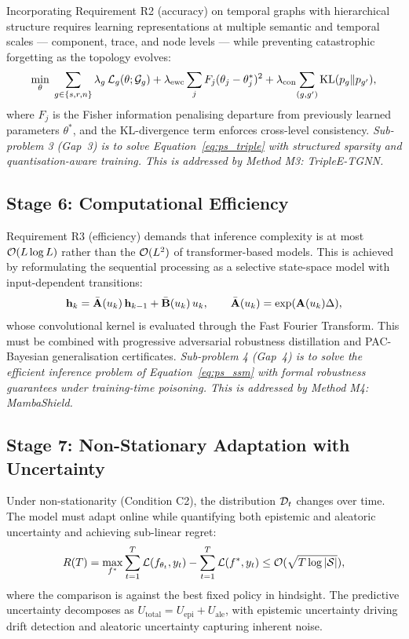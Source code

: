 Incorporating Requirement R2 (accuracy) on temporal graphs with hierarchical structure requires learning representations at multiple semantic and temporal scales --- component, trace, and node levels --- while preventing catastrophic forgetting as the topology evolves:
\begin{equation}
\min_\theta\;
\sum_{g\in\{s,r,n\}}\lambda_g\,\mathcal{L}_g(\theta;\mathcal{G}_g)
+ \lambda_{\mathrm{ewc}}\sum_j F_j(\theta_j-\theta_{j}^{*})^2
+ \lambda_{\mathrm{con}}\!\sum_{(g,g')}\mathrm{KL}(p_g\|p_{g'}),
\label{eq:ps_triple}
\end{equation}
where $F_j$ is the Fisher information penalising departure from previously learned parameters $\theta^*$, and the KL-divergence term enforces cross-level consistency. \emph{Sub-problem 3 (Gap~3) is to solve Equation~\eqref{eq:ps_triple} with structured sparsity and quantisation-aware training. This is addressed by Method M3: TripleE-TGNN.}


\subsection{Stage 6: Computational Efficiency}

Requirement R3 (efficiency) demands that inference complexity is at most $\mathcal{O}(L\log L)$ rather than the $\mathcal{O}(L^2)$ of transformer-based models. This is achieved by reformulating the sequential processing as a selective state-space model with input-dependent transitions:
\begin{equation}
\mathbf{h}_{k} = \bar{\mathbf{A}}(u_k)\,\mathbf{h}_{k-1} + \bar{\mathbf{B}}(u_k)\,u_k,
\qquad
\bar{\mathbf{A}}(u_k)=\exp(\mathbf{A}(u_k)\Delta),
\label{eq:ps_ssm}
\end{equation}
whose convolutional kernel is evaluated through the Fast Fourier Transform. This must be combined with progressive adversarial robustness distillation and PAC-Bayesian generalisation certificates. \emph{Sub-problem 4 (Gap~4) is to solve the efficient inference problem of Equation~\eqref{eq:ps_ssm} with formal robustness guarantees under training-time poisoning. This is addressed by Method M4: MambaShield.}


\subsection{Stage 7: Non-Stationary Adaptation with Uncertainty}

Under non-stationarity (Condition C2), the distribution $\mathcal{D}_t$ changes over time. The model must adapt online while quantifying both epistemic and aleatoric uncertainty and achieving sub-linear regret:
\begin{equation}
R(T) = \max_{f^*}\sum_{t=1}^{T}\mathcal{L}(f_{\theta_t},y_t) - \sum_{t=1}^{T}\mathcal{L}(f^*,y_t) \le \mathcal{O}(\sqrt{T\log|\mathcal{S}|}),
\label{eq:ps_regret}
\end{equation}
where the comparison is against the best fixed policy in hindsight. The predictive uncertainty decomposes as $U_{\mathrm{total}} = U_{\mathrm{epi}} + U_{\mathrm{ale}}$, with epistemic uncertainty driving drift detection and aleatoric uncertainty capturing inherent noise.

